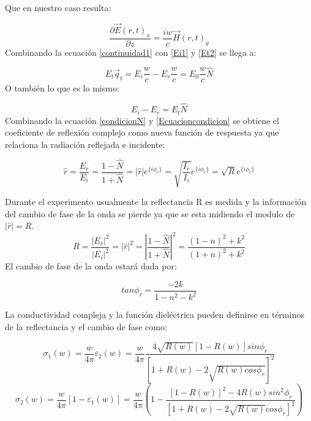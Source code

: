 \documentclass[a4paper,openright,12pt]{book}
\begin{document}
Que en nuestro caso resulta:

\begin{equation}\label{continuidad1}
\frac{\partial \vec{E}(r,t)_{x}}{\partial z}=\frac{iw}{c}\vec{H}(r,t)_{y}
\end{equation}
Combinando la ecuación \ref{continuidad1} con \ref{Ei1} y \ref{Et2} se llega a:

\begin{equation}
E_{t}\vec{q}_{t}=E_{i}\frac{w}{c}-E_{r}\frac{w}{c}=E_{0}\frac{w}{c}\hat{N}
\end{equation}
O también lo que es lo mismo:

\begin{equation}\label{condicionN}
E_{i}-E_{r}=E_{t}\hat{N}
\end{equation}
Combinando la ecuación \ref{condicionN} y \ref{Ecuacioncondicion} se obtiene el coeficiente de reflexión complejo como nueva función de respuesta ya que relaciona la radiación reflejada e incidente:

\begin{equation}
\hat{r}=\frac{E_{r}}{E_{i}}=\frac{1-\hat{N}}{1+\hat{N}}=|\hat{r}|e^{\{i\phi_{r}\}}=\sqrt{\frac{I_{r}}{I_{i}}}e^{\{i\phi_{r}\}}=\sqrt{R}e^{\{i\phi_{r}\}}
\end{equation}

Durante el experimento usualmente la reflectancia R es medida  y la información del cambio de fase de la onda se pierde ya que se esta midiendo el modulo de $|\hat{r}|=R$.
\begin{equation}
R=\frac{|E_{r}|^{2}}{|E_{i}|^{2}}=|\hat{r}|^{2}=|\frac{1-\hat{N}}{1+\hat{N}}|^{2}=\frac{(1-n)^{2}+k^{2}}{(1+n)^{2}+k^{2}}
\end{equation}
El cambio de fase de la onda estará dada por:

\begin{equation}
tan\phi_{r}=\frac{-2k}{1-n^{2}-k^{2}}
\end{equation}

La conductividad compleja y la función dieléctrica pueden definirse  en términos de la reflectancia y el cambio de fase como:

\begin{equation}
\sigma_{1}(w)=\frac{w}{4\pi}\varepsilon_{2}(w)=\frac{w}{4\pi}\frac{4\sqrt{R(w)}[1-R(w)]sin\phi_{r}}{[1+R(w)-2\sqrt{R(w)cos\phi_{r}}]^{2}}
\end{equation}
\begin{equation}
\sigma_{2}(w)=\frac{w}{4\pi}[1-\varepsilon_{1}(w)]=\frac{w}{4\pi}(1-\frac{[1-R(w)]^{2}-4R(w)sin^{2}\phi_{r}}{[1+R(w)-2\sqrt{R(w)}cos\phi_{r}]^{2}})
\end{equation}
\end{document}
